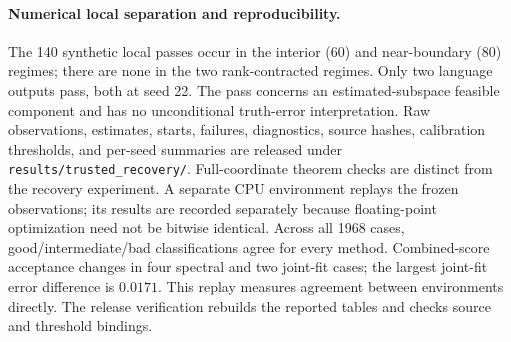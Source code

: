 \paragraph{Numerical local separation and reproducibility.}
The 140 synthetic local passes occur in the interior (60) and near-boundary
(80) regimes; there are none in the two rank-contracted regimes.
Only two language outputs pass, both at seed 22.
The pass concerns an estimated-subspace feasible component and has no
unconditional truth-error interpretation.
Raw observations, estimates, starts, failures, diagnostics, source hashes,
calibration thresholds, and per-seed summaries are released under
\texttt{results/trusted\_recovery/}.
Full-coordinate theorem checks are distinct from the recovery experiment.
A separate CPU environment replays the frozen observations; its results
are recorded separately because floating-point optimization need not be
bitwise identical. Across all 1968 cases, good/intermediate/bad classifications
agree for every method. Combined-score acceptance changes in four spectral
and two joint-fit cases; the largest joint-fit error difference is $0.0171$.
This replay measures agreement between environments directly.
The release verification rebuilds the reported tables
and checks source and threshold bindings.
